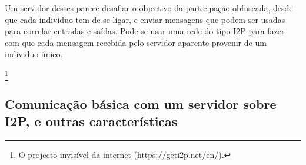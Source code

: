 
Um servidor desses parece desafiar o objectivo da participação obfuscada, desde que cada individuo tem de se ligar, e enviar mensagens que podem ser usadas para correlar entradas e saídas. Pode-se usar uma rede do tipo I2P para fazer com que cada mensagem recebida pelo servidor aparente provenir de um individuo único. 

\footnote{O projecto invisível da internet (\url{https://geti2p.net/en/}).}

\subsection{Comunicação básica com um servidor sobre I2P, e outras características}
\label{subsec:txtangle-host-communication}

